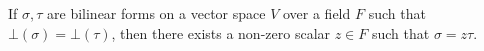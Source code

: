 If $\sigma, \tau$ are bilinear forms on a vector space $V$ over a field $F$ such that $\bot(\sigma) = \bot(\tau)$, then there exists a non-zero scalar $z \in F$ such that $\sigma = z\tau$.
